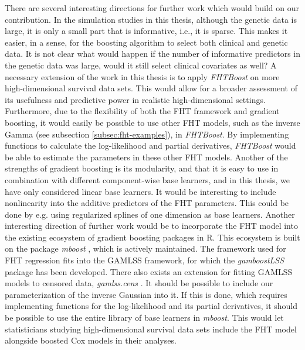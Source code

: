 There are several interesting directions for further work which would build on our contribution.
In the simulation studies in this thesis, although the genetic data is large, it is only a small part that is informative, i.e., it is sparse.
This makes it easier, in a sense, for the boosting algorithm to select both clinical and genetic data.
It is not clear what would happen if the number of informative predictors in the genetic data was large, would it still select clinical covariates as well?
A necessary extension of the work in this thesis is to apply \textit{FHTBoost} on more high-dimensional survival data sets.
This would allow for a broader assessment of its usefulness and predictive power in realistic high-dimensional settings.
Furthermore, due to the flexibility of both the FHT framework and gradient boosting, it would easily be possible to use other FHT models, such as the inverse Gamma (see subsection \ref{subsec:fht-examples}), in \textit{FHTBoost}.
By implementing functions to calculate the log-likelihood and partial derivatives, \textit{FHTBoost} would be able to estimate the parameters in these other FHT models.
Another of the strengths of gradient boosting is its modularity, and that it is easy to use in combination with different component-wise base learners, and in this thesis, we have only considered linear base learners.
It would be interesting to include nonlinearity into the additive predictors of the FHT parameters.
This could be done by e.g. using regularized splines of one dimension as base learners.
Another interesting direction of further work would be to incorporate the FHT model into the existing ecosystem of gradient boosting packages in R.
This ecosystem is built on the package \textit{mboost} \citep{mboost}, which is actively maintained.
The framework used for FHT regression fits into the GAMLSS \citep{gamlss} framework, for which the \textit{gamboostLSS} package \citep{gamboostlss-paper, gamboostLSS-manual} has been developed.
There also exists an extension for fitting GAMLSS models to censored data, \textit{gamlss.cens} \citep{gamlsscens}.
It should be possible to include our parameterization of the inverse Gaussian into it.
If this is done, which requires implementing functions for the log-likelihood and its partial derivatives, it should be possible to use the entire library of base learners in \textit{mboost}.
This would let statisticians studying high-dimensional survival data sets include the FHT model alongside boosted Cox models in their analyses.
